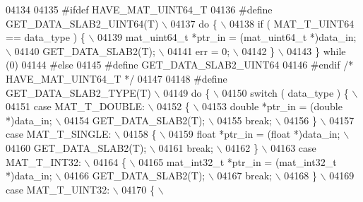 \begin{DoxyCode}
{{{{{{{{{{{{{{{{{{{{{{{{{04134 
04135 \textcolor{preprocessor}{#ifdef HAVE\_MAT\_UINT64\_T}
04136 \textcolor{preprocessor}{#define GET\_DATA\_SLAB2\_UINT64(T) \(\backslash\)}
04137 \textcolor{preprocessor}{    do \{ \(\backslash\)}
04138 \textcolor{preprocessor}{        if ( MAT\_T\_UINT64 == data\_type ) \{ \(\backslash\)}
04139 \textcolor{preprocessor}{            mat\_uint64\_t *ptr\_in = (mat\_uint64\_t *)data\_in; \(\backslash\)}
04140 \textcolor{preprocessor}{            GET\_DATA\_SLAB2(T); \(\backslash\)}
04141 \textcolor{preprocessor}{            err = 0; \(\backslash\)}
04142 \textcolor{preprocessor}{        \} \(\backslash\)}
04143 \textcolor{preprocessor}{    \} while (0)}
04144 \textcolor{preprocessor}{#else}
04145 \textcolor{preprocessor}{#define GET\_DATA\_SLAB2\_UINT64}
04146 \textcolor{preprocessor}{#endif }\textcolor{comment}{/* HAVE\_MAT\_UINT64\_T */}\textcolor{preprocessor}{}
04147 
04148 \textcolor{preprocessor}{#define GET\_DATA\_SLAB2\_TYPE(T) \(\backslash\)}
04149 \textcolor{preprocessor}{    do \{ \(\backslash\)}
04150 \textcolor{preprocessor}{        switch ( data\_type ) \{ \(\backslash\)}
04151 \textcolor{preprocessor}{            case MAT\_T\_DOUBLE: \(\backslash\)}
04152 \textcolor{preprocessor}{            \{ \(\backslash\)}
04153 \textcolor{preprocessor}{                double *ptr\_in = (double *)data\_in; \(\backslash\)}
04154 \textcolor{preprocessor}{                GET\_DATA\_SLAB2(T); \(\backslash\)}
04155 \textcolor{preprocessor}{                break; \(\backslash\)}
04156 \textcolor{preprocessor}{            \} \(\backslash\)}
04157 \textcolor{preprocessor}{            case MAT\_T\_SINGLE: \(\backslash\)}
04158 \textcolor{preprocessor}{            \{ \(\backslash\)}
04159 \textcolor{preprocessor}{                float *ptr\_in = (float *)data\_in; \(\backslash\)}
04160 \textcolor{preprocessor}{                GET\_DATA\_SLAB2(T); \(\backslash\)}
04161 \textcolor{preprocessor}{                break; \(\backslash\)}
04162 \textcolor{preprocessor}{            \} \(\backslash\)}
04163 \textcolor{preprocessor}{            case MAT\_T\_INT32: \(\backslash\)}
04164 \textcolor{preprocessor}{            \{ \(\backslash\)}
04165 \textcolor{preprocessor}{                mat\_int32\_t *ptr\_in = (mat\_int32\_t *)data\_in; \(\backslash\)}
04166 \textcolor{preprocessor}{                GET\_DATA\_SLAB2(T); \(\backslash\)}
04167 \textcolor{preprocessor}{                break; \(\backslash\)}
04168 \textcolor{preprocessor}{            \} \(\backslash\)}
04169 \textcolor{preprocessor}{            case MAT\_T\_UINT32: \(\backslash\)}
04170 \textcolor{preprocessor}{            \{ \(\backslash\)}
}}}}}}}}}}}}}}}}}}}}}}}}}
\end{DoxyCode}
